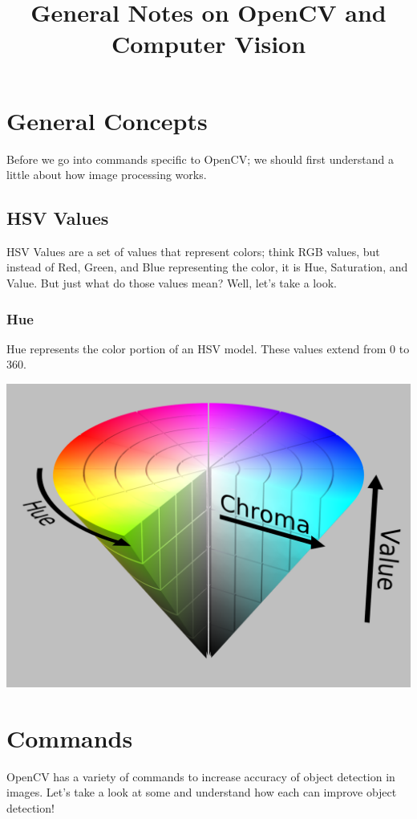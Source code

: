 \documentclass[12pt]{article}
\begin{document}
\title{General Notes on OpenCV and Computer Vision}
\author{}
\date{}
\maketitle


\section{General Concepts}
Before we go into commands specific to OpenCV; we should first understand a little about how image processing works.
\subsection*{HSV Values}
HSV Values are a set of values that represent colors; think RGB values, but instead of Red, Green, and Blue representing the color, it is Hue, Saturation, and Value. But just what do those values mean? Well, let's take a look.
\subsubsection*{Hue}
Hue represents the color portion of an HSV model. These values extend from 0 to 360.

\includegraphics[width=\textwidth]{HSVcolormodel}

\section{Commands}
OpenCV has a variety of commands to increase accuracy of object detection in images. Let's take a look at some and understand how each can improve object detection!
\end{document}

